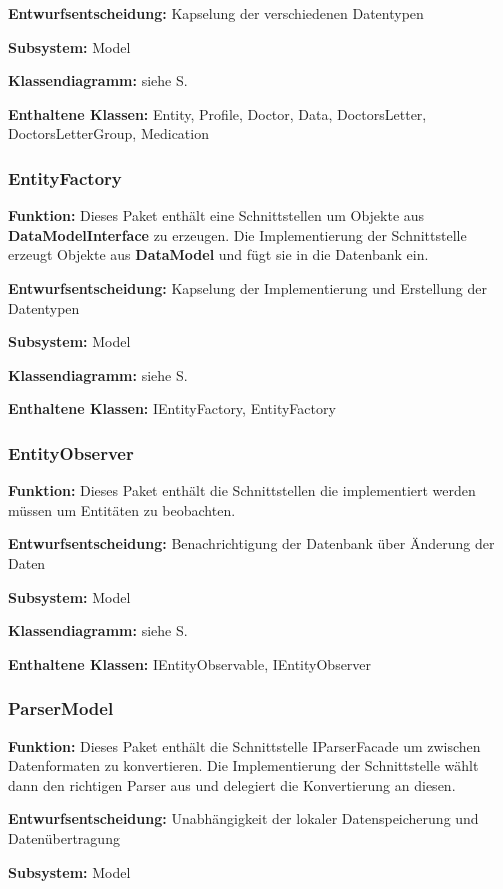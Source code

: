 \documentclass[a4paper]{scrreprt}
\begin{document}
\textbf{Entwurfsentscheidung:} Kapselung der verschiedenen Datentypen

\textbf{Subsystem:} Model

\textbf{Klassendiagramm:} siehe S.

\textbf{Enthaltene Klassen:} Entity, Profile, Doctor, Data, DoctorsLetter, DoctorsLetterGroup, Medication

\subsubsection{EntityFactory}
\textbf{Funktion:} Dieses Paket enthält eine Schnittstellen um Objekte aus \textbf{DataModelInterface} zu erzeugen.
Die Implementierung der Schnittstelle erzeugt Objekte aus \textbf{DataModel} und fügt sie in die Datenbank ein.

\textbf{Entwurfsentscheidung:} Kapselung der Implementierung und Erstellung der Datentypen

\textbf{Subsystem:} Model

\textbf{Klassendiagramm:} siehe S.

\textbf{Enthaltene Klassen:} IEntityFactory, EntityFactory

\subsubsection{EntityObserver}
\textbf{Funktion:} Dieses Paket enthält die Schnittstellen die implementiert werden müssen um Entitäten zu beobachten.

\textbf{Entwurfsentscheidung:} Benachrichtigung der Datenbank über Änderung der Daten

\textbf{Subsystem:} Model

\textbf{Klassendiagramm:} siehe S.

\textbf{Enthaltene Klassen:} IEntityObservable, IEntityObserver

\subsubsection{ParserModel}
\textbf{Funktion:} Dieses Paket enthält die Schnittstelle IParserFacade um zwischen Datenformaten zu konvertieren.
Die Implementierung der Schnittstelle wählt dann den richtigen Parser aus und delegiert die Konvertierung an diesen.

\textbf{Entwurfsentscheidung:} Unabhängigkeit der lokaler Datenspeicherung und Datenübertragung

\textbf{Subsystem:} Model
\end{document}
